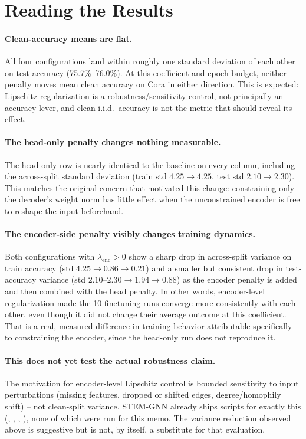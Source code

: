 \documentclass{article}
\begin{document}
\section{Reading the Results}

\paragraph{Clean-accuracy means are flat.} All four configurations land
within roughly one standard deviation of each other on test accuracy
(75.7\%--76.0\%). At this coefficient and epoch budget, neither penalty
moves mean clean accuracy on Cora in either direction. This is expected:
Lipschitz regularization is a robustness/sensitivity control, not
principally an accuracy lever, and clean i.i.d.\ accuracy is not the metric
that should reveal its effect.

\paragraph{The head-only penalty changes nothing measurable.} The
head-only row is nearly identical to the baseline on every column,
including the across-split standard deviation (train std $4.25 \to 4.25$,
test std $2.10 \to 2.30$). This matches the original concern that motivated
this change: constraining only the decoder's weight norm has little
effect when the unconstrained encoder is free to reshape the input
beforehand.

\paragraph{The encoder-side penalty visibly changes training dynamics.}
Both configurations with $\lambda_{\text{enc}} > 0$ show a sharp drop in
across-split variance on train accuracy (std $4.25 \to 0.86 \to 0.21$) and
a smaller but consistent drop in test-accuracy variance (std
$2.10\text{--}2.30 \to 1.94 \to 0.88$) as the encoder penalty is added and
then combined with the head penalty. In other words, encoder-level
regularization made the 10 finetuning runs converge more consistently with
each other, even though it did not change their average outcome at this
coefficient. That is a real, measured difference in training behavior
attributable specifically to constraining the encoder, since the head-only
run does not reproduce it.

\paragraph{This does not yet test the actual robustness claim.} The
motivation for encoder-level Lipschitz control is bounded sensitivity to
input perturbations (missing features, dropped or shifted edges,
degree/homophily shift) -- not clean-split variance. STEM-GNN already ships
scripts for exactly this (,
,
,
), none of which were run for this
memo. The variance reduction observed above is suggestive but is not, by
itself, a substitute for that evaluation.
\end{document}
